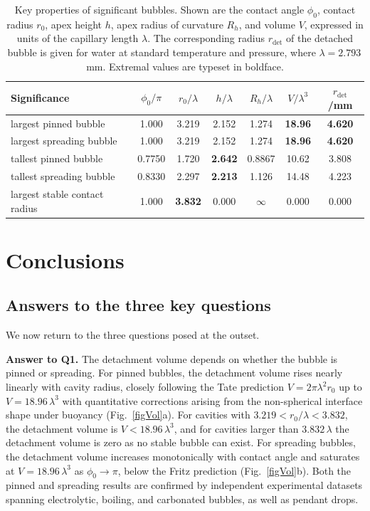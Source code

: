 \documentclass[9pt]{extarticle}
\begin{document}
\begin{table}\small
\caption{Key properties of significant bubbles. Shown are the contact angle $\phi_0$, contact radius $r_0$, apex height $h$, apex radius of curvature $R_h$, and volume $V$, expressed in units of the capillary length $\lambda$. The corresponding radius $r_\mathrm{det}$ of the detached bubble is given for water at standard temperature and pressure, where $\lambda=2.793$\,mm. Extremal values are typeset in boldface.}\label{tabSig}
\begin{center}
\begin{tabular}{lcccccc}
\hline
Significance              & $\phi_0/\pi$          & $r_0/\lambda$& $h/\lambda$ & $R_h/\lambda$ & $V/\lambda^3$ & $r_\mathrm{det}$/mm \\ \hline
largest pinned bubble     & 1.000  & 3.219        & 2.152        & 1.274       &\textbf{18.96} & \textbf{4.620}\\
largest spreading bubble  & 1.000  & 3.219        & 2.152        & 1.274       &\textbf{18.96} & \textbf{4.620}\\
tallest pinned bubble     & 0.7750 & 1.720        &\textbf{2.642}& 0.8867      & 10.62         & 3.808\\
tallest spreading bubble  & 0.8330 & 2.297        &\textbf{2.213}& 1.126       & 14.48         & 4.223\\
largest stable contact radius& 1.000  &\textbf{3.832}& 0.000     & $\infty$    & 0.000         & 0.000 \\
\hline
\end{tabular}
\end{center}
\end{table}

\section{Conclusions}\label{secConclusions}

\subsection{Answers to the three key questions}

We now return to the three questions posed at the outset. 

\textbf{Answer to Q1.} The detachment volume depends on whether the bubble is pinned or spreading. For pinned bubbles, the detachment volume rises nearly linearly with cavity radius, closely following the Tate prediction $V = 2\pi\lambda^2 r_0$ up to $V = 18.96\,\lambda^3$ with quantitative corrections arising from the non-spherical interface shape under buoyancy (Fig.~\ref{figVol}a). For cavities with $3.219<r_0/\lambda<3.832$, the detachment volume is $V<18.96\,\lambda^3$, and for cavities larger than $3.832\,\lambda$ the detachment volume is zero as no stable bubble can exist. For spreading bubbles, the detachment volume increases monotonically with contact angle and saturates at $V = 18.96\,\lambda^3$ as $\phi_0 \to \pi$, below the Fritz prediction (Fig.~\ref{figVol}b). Both the pinned and spreading results are confirmed by independent experimental datasets spanning electrolytic, boiling, and carbonated bubbles, as well as pendant drops. 
\end{document}
